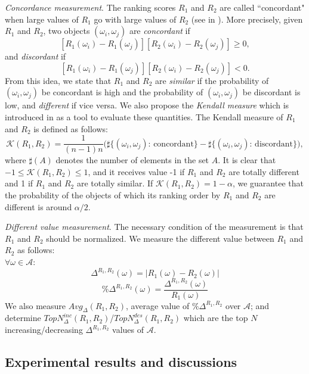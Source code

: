 \documentclass[10pt,leqno,twoside]{article}
\begin{document}
\textit{Concordance measurement}. The ranking scores $R_1$ and $R_2$ are called ``concordant" when large values of $R_1$ go with large values of $R_2$ (see in \cite{Nelsen2006}). More precisely, given $R_1$ and $R_2$, two objects $(\omega_i , \omega_j)$ are \emph{concordant} if
\[[R_1(\omega_i)-R_1(\omega_j)][R_2(\omega_i)-R_2(\omega_j)] \geqslant 0,\]
and \emph{discordant} if
\[[R_1(\omega_i)-R_1(\omega_j)][R_2(\omega_i)-R_2(\omega_j)] < 0.\]
From this idea, we state that $R_1$ and $R_2$ are \emph{similar} if the probability of $(\omega_i,\omega_j)$ be concordant is high and the probability of $(\omega_i,\omega_j)$ be discordant is low, and \emph{different} if vice versa. We also propose the \emph{Kendall measure} which is introduced in \cite{Kendall1938} as a tool to evaluate these quantities. The Kendall measure of $R_1$ and $R_2$ is defined as follows:
\begin{equation}
\mathcal{K}(R_1,R_2) = \frac{1}{(n-1)n}\Big(\sharp\big\{(\omega_i,\omega_j) \text{: concordant}\big\} - \sharp\big\{(\omega_i,\omega_j) \text{: discordant}\big\}\Big),
\end{equation}
where $\sharp(A)$ denotes the number of elements in the set $A$. It is clear that $-1 \leqslant \mathcal{K}(R_1,R_2) \leqslant 1$, and it receives value -1 if $R_1$ and $R_2$ are totally different and 1 if $R_1$ and $R_2$ are totally similar. If $\mathcal{K}(R_1,R_2) = 1-\alpha$, we guarantee that the probability of the objects of which its ranking order by $R_1$ and $R_2$ are different is around $\alpha/2$.

\textit{Different value measurement}. The necessary condition of the measurement is that $R_1$ and $R_2$ should be normalized. We measure the different value between $R_1$ and $R_2$ as follows:\\
$\forall \omega \in \mathcal{A}:$
\begin{equation}
 \Delta^{R_1,R_2}(\omega)= |R_1(\omega) - R_2(\omega)| 
\end{equation} 
 \begin{equation}
 \%\Delta^{R_1,R_2}(\omega)= \frac{\Delta^{R_1,R_2}(\omega)}{R_1(\omega)}
\end{equation} 
We also measure $Avg_{\Delta}(R_1,R_2)$, average value of $\%\Delta^{R_1,R_2}$ over $\mathcal{A}$; and determine $TopN^{inc}_{\Delta}(R_1,R_2)$/$TopN^{des}_{\Delta}(R_1,R_2)$  which are the top $N$  increasing/decreasing  $\Delta^{R_1,R_2}$ values 
of $\mathcal{A}$.
\subsection{Experimental results and discussions}\label{Sect:Result}
\end{document}
